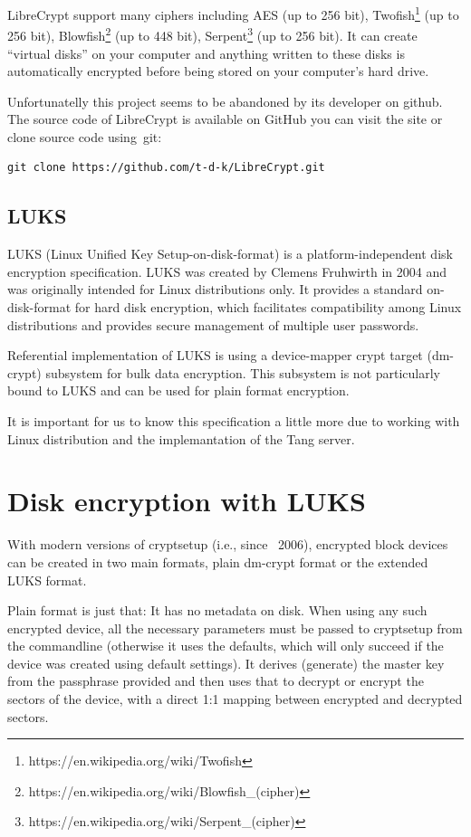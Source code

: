 LibreCrypt support many ciphers including AES (up to 256 bit), Twofish\footnote{https://en.wikipedia.org/wiki/Twofish} (up to 256 bit), Blowfish\footnote{https://en.wikipedia.org/wiki/Blowfish\_(cipher)} (up to 448 bit), Serpent\footnote{https://en.wikipedia.org/wiki/Serpent\_(cipher)} (up to 256 bit)\cite{librecrypt}.
It can create “virtual disks” on your computer and anything written to these disks is automatically encrypted before being stored on your computer’s hard drive\cite{FreeOTFE}.

Unfortunatelly this project seems to be abandoned by its developer on github.
The source code of LibreCrypt is available on GitHub you can visit the site or clone source code using~git:
\begin{lstlisting}[columns=fixed,tabsize=4,backgroundcolor=\color{yellow!10}]
git clone https://github.com/t-d-k/LibreCrypt.git
\end{lstlisting}

\subsection{LUKS}

LUKS (Linux Unified Key Setup-on-disk-format) is a platform-independent disk encryption specification.
LUKS was created by Clemens Fruhwirth in 2004 and was originally intended for Linux distributions only.
It provides a standard on-disk-format for hard disk encryption, which facilitates compatibility among Linux distributions and provides secure management of multiple user passwords.

Referential implementation of LUKS is using a device-mapper crypt target (dm-crypt) subsystem for bulk data encryption.
This subsystem is not particularly bound to LUKS and can be used for plain format encryption.

It is important for us to know this specification a little more due to working with Linux distribution and the implemantation of the Tang server.

\section{Disk encryption with LUKS} 

With modern versions of cryptsetup (i.e., since ~2006), encrypted block devices can be created in two main formats, plain dm-crypt format or the extended LUKS format.

Plain format is just that: It has no metadata on disk.
When using any such encrypted device, all the necessary parameters must be passed to cryptsetup from the commandline (otherwise it uses the defaults, which will only succeed if the device was created using default settings).
It derives (generate) the master key from the passphrase provided and then uses that to decrypt or encrypt the sectors of the device, with a direct 1:1 mapping between encrypted and decrypted sectors.

